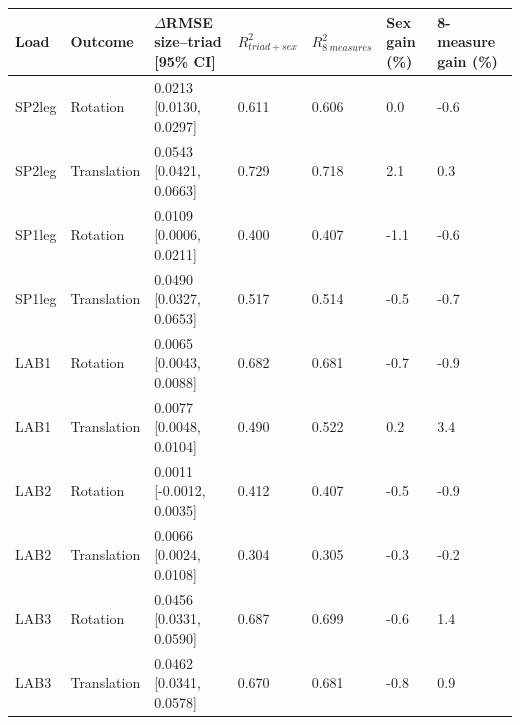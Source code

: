 \begin{tabular}{lllllll}
\toprule
Load & Outcome & $\Delta$RMSE size--triad [95\% CI] & $R^2_{triad+sex}$ & $R^2_{8\ measures}$ & Sex gain (\%) & 8-measure gain (\%) \\
\midrule
SP2leg & Rotation & 0.0213 [0.0130, 0.0297] & 0.611 & 0.606 & 0.0 & -0.6 \\
SP2leg & Translation & 0.0543 [0.0421, 0.0663] & 0.729 & 0.718 & 2.1 & 0.3 \\
SP1leg & Rotation & 0.0109 [0.0006, 0.0211] & 0.400 & 0.407 & -1.1 & -0.6 \\
SP1leg & Translation & 0.0490 [0.0327, 0.0653] & 0.517 & 0.514 & -0.5 & -0.7 \\
LAB1 & Rotation & 0.0065 [0.0043, 0.0088] & 0.682 & 0.681 & -0.7 & -0.9 \\
LAB1 & Translation & 0.0077 [0.0048, 0.0104] & 0.490 & 0.522 & 0.2 & 3.4 \\
LAB2 & Rotation & 0.0011 [-0.0012, 0.0035] & 0.412 & 0.407 & -0.5 & -0.9 \\
LAB2 & Translation & 0.0066 [0.0024, 0.0108] & 0.304 & 0.305 & -0.3 & -0.2 \\
LAB3 & Rotation & 0.0456 [0.0331, 0.0590] & 0.687 & 0.699 & -0.6 & 1.4 \\
LAB3 & Translation & 0.0462 [0.0341, 0.0578] & 0.670 & 0.681 & -0.8 & 0.9 \\
\bottomrule
\end{tabular}
